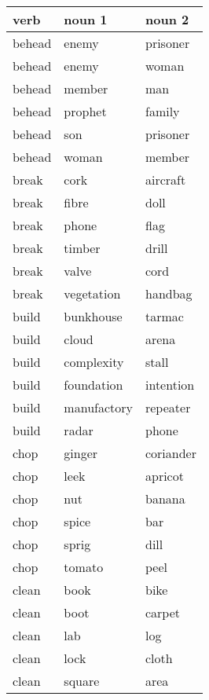 \begin{longtable}{l|ll}
\textbf{verb}      & \textbf{noun 1}    & \textbf{noun 2}    \\
\hline
\endhead
behead    & enemy          & prisoner     \\
behead    & enemy          & woman        \\
behead    & member         & man          \\
behead    & prophet        & family       \\
behead    & son            & prisoner     \\
behead    & woman          & member       \\
break     & cork           & aircraft     \\
break     & fibre          & doll         \\
break     & phone          & flag         \\
break     & timber         & drill        \\
break     & valve          & cord         \\
break     & vegetation     & handbag      \\
build     & bunkhouse      & tarmac       \\
build     & cloud          & arena        \\
build     & complexity     & stall        \\
build     & foundation     & intention    \\
build     & manufactory    & repeater     \\
build     & radar          & phone        \\
chop      & ginger         & coriander    \\
chop      & leek           & apricot      \\
chop      & nut            & banana       \\
chop      & spice          & bar          \\
chop      & sprig          & dill         \\
chop      & tomato         & peel         \\
clean     & book           & bike         \\
clean     & boot           & carpet       \\
clean     & lab            & log          \\
clean     & lock           & cloth        \\
clean     & square         & area         \\

\end{longtable}
